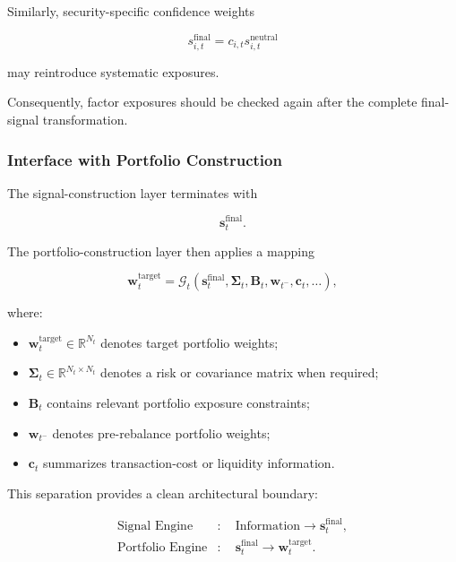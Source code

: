 \documentclass[11pt,a4paper]{article}
\begin{document}
Similarly, security-specific confidence weights

\begin{equation}
s_{i,t}^{\mathrm{final}}
=
c_{i,t}
s_{i,t}^{\mathrm{neutral}}
\end{equation}

may reintroduce systematic exposures.

Consequently, factor exposures should be checked again after the complete
final-signal transformation.


\subsubsection{Interface with Portfolio Construction}

The signal-construction layer terminates with

\begin{equation}
\boxed{
\mathbf{s}_t^{\mathrm{final}}.
}
\end{equation}

The portfolio-construction layer then applies a mapping

\begin{equation}
\boxed{
\mathbf{w}_t^{\mathrm{target}}
=
\mathcal{G}_t
\left(
\mathbf{s}_t^{\mathrm{final}},
\mathbf{\Sigma}_t,
\mathbf{B}_t,
\mathbf{w}_{t^-},
\mathbf{c}_t,
\ldots
\right),
}
\end{equation}

where:

\begin{itemize}
    \item $\mathbf{w}_t^{\mathrm{target}}\in\mathbb{R}^{N_t}$ denotes target
    portfolio weights;
    \item $\mathbf{\Sigma}_t\in\mathbb{R}^{N_t\times N_t}$ denotes a risk or
    covariance matrix when required;
    \item $\mathbf{B}_t$ contains relevant portfolio exposure constraints;
    \item $\mathbf{w}_{t^-}$ denotes pre-rebalance portfolio weights;
    \item $\mathbf{c}_t$ summarizes transaction-cost or liquidity information.
\end{itemize}

This separation provides a clean architectural boundary:

\begin{equation}
\boxed{
\begin{aligned}
\text{Signal Engine}
&:
\quad
\text{Information}
\rightarrow
\mathbf{s}_t^{\mathrm{final}},
\\[0.15cm]
\text{Portfolio Engine}
&:
\quad
\mathbf{s}_t^{\mathrm{final}}
\rightarrow
\mathbf{w}_t^{\mathrm{target}}.
\end{aligned}
}
\end{equation}
\end{document}
